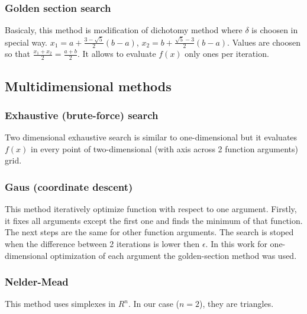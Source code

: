 \subsubsection*{Golden section search}

Basicaly, this method is modification of dichotomy method where $\delta$ is choosen in special way.
$x_1 = a + \frac{3 - \sqrt{5}}{2}(b - a)$, $x_2 = b + \frac{\sqrt{5} - 3}{2}(b - a)$. Values are choosen so that $\frac{x_1 + x_2}{2} = \frac{a + b}{2}$.
It allows to evaluate $f(x)$ only ones per iteration.

\subsection*{Multidimensional methods}
\subsubsection*{Exhaustive (brute-force) search}

Two dimensional exhaustive search is similar to one-dimensional but it evaluates $f(x)$ in every point of two-dimensional (with axis across 2 function arguments) grid.

\subsubsection*{Gaus (coordinate descent)}

This method iteratively optimize function with respect to one argument. Firstly, it fixes all arguments except the first one and finds the minimum of that function. The next steps are the same for other function arguments.
The search is stoped when the difference between 2 iterations is lower then $\epsilon$. In this work for one-dimensional optimization of each argument the golden-section method was used.

\subsubsection*{Nelder-Mead}

This method uses simplexes in $R^n$. In our case ($n = 2$), they are triangles.

